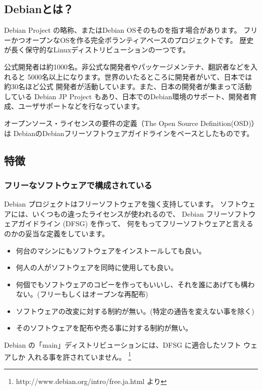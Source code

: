 \documentclass[mingoth,a4paper]{jsarticle}
\begin{document}
\subsection{Debianとは？}

Debian Project の略称、またはDebian OSそのものを指す場合があります。
フリーかつオープンなOSを作る完全ボランティアベースのプロジェクトです。
歴史が長く保守的なLinuxディストリビューションの一つです。

公式開発者は約1000名。非公式な開発者やパッケージメンテナ、翻訳者などを入れると
5000名以上になります。世界のいたるところに開発者がいて、日本では約30名ほど公式
開発者が活動しています。また、日本の開発者が集まって活動している Debian JP Project
もあり、日本でのDebian環境のサポート、開発者育成、ユーザサポートなどを行なっています。

オープンソース・ライセンスの要件の定義（The Open Source Definition(OSD)）は
DebianのDebianフリーソフトウェアガイドラインをベースとしたものです。

\subsection{特徴}

\subsubsection{フリーなソフトウェアで構成されている}
Debian プロジェクトはフリーソフトウェアを強く支持しています。
ソフトウェアには、いくつもの違ったライセンスが使われるので、 
Debian フリーソフトウェアガイドライン (DFSG) を作って、 
何をもってフリーソフトウェアと言えるのかの妥当な定義をしています。 

\begin{itemize}
\item 何台のマシンにもソフトウェアをインストールしても良い。
\item 何人の人がソフトウェアを同時に使用しても良い。
\item 何個でもソフトウェアのコピーを作ってもいいし、それを誰にあげても構わない。(フリーもしくはオープンな再配布)
\item ソフトウェアの改変に対する制約が無い。(特定の通告を変えない事を除く)
\item そのソフトウェアを配布や売る事に対する制約が無い。
\end{itemize}

Debian の「main」ディストリビューションには、DFSG に適合したソフト
ウェアしか 入れる事を許されていません。
\footnote{http://www.debian.org/intro/free.ja.html より}
\end{document}
